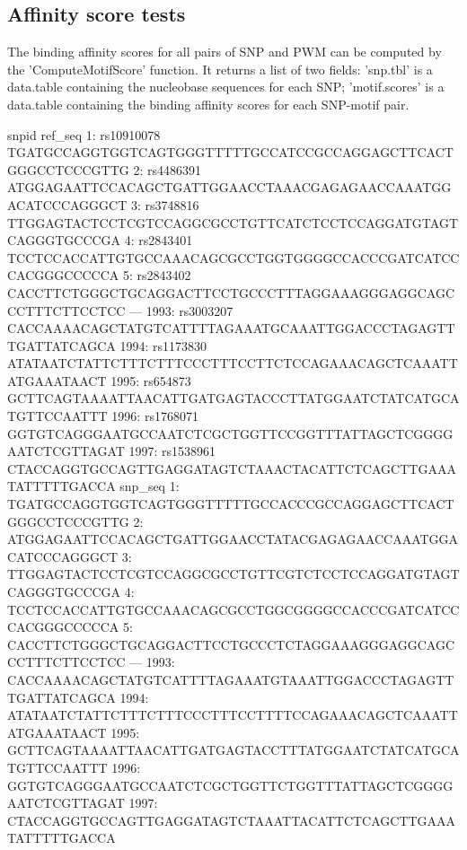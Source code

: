 \documentclass[a4paper,10pt]{article}
\begin{document}
\subsection{Affinity score tests}

The binding affinity scores for all pairs of SNP and PWM can be computed by the 'ComputeMotifScore' function. It returns a list of two fields: 'snp.tbl' is a data.table containing the nucleobase sequences for each SNP; 'motif.scores' is a data.table containing the binding affinity scores for each SNP-motif pair.

\begin{Schunk}
\begin{Soutput}
           snpid                                                       ref_seq
   1: rs10910078 TGATGCCAGGTGGTCAGTGGGTTTTTGCCATCCGCCAGGAGCTTCACTGGGCCTCCCGTTG
   2:  rs4486391 ATGGAGAATTCCACAGCTGATTGGAACCTAAACGAGAGAACCAAATGGACATCCCAGGGCT
   3:  rs3748816 TTGGAGTACTCCTCGTCCAGGCGCCTGTTCATCTCCTCCAGGATGTAGTCAGGGTGCCCGA
   4:  rs2843401 TCCTCCACCATTGTGCCAAACAGCGCCTGGTGGGGCCACCCGATCATCCCACGGGCCCCCA
   5:  rs2843402 CACCTTCTGGGCTGCAGGACTTCCTGCCCTTTAGGAAAGGGAGGCAGCCCTTTCTTCCTCC
  ---                                                                         
1993:  rs3003207 CACCAAAACAGCTATGTCATTTTAGAAATGCAAATTGGACCCTAGAGTTTGATTATCAGCA
1994:  rs1173830 ATATAATCTATTCTTTCTTTCCCTTTCCTTCTCCAGAAACAGCTCAAATTATGAAATAACT
1995:   rs654873 GCTTCAGTAAAATTAACATTGATGAGTACCCTTATGGAATCTATCATGCATGTTCCAATTT
1996:  rs1768071 GGTGTCAGGGAATGCCAATCTCGCTGGTTCCGGTTTATTAGCTCGGGGAATCTCGTTAGAT
1997:  rs1538961 CTACCAGGTGCCAGTTGAGGATAGTCTAAACTACATTCTCAGCTTGAAATATTTTTGACCA
                                                            snp_seq
   1: TGATGCCAGGTGGTCAGTGGGTTTTTGCCACCCGCCAGGAGCTTCACTGGGCCTCCCGTTG
   2: ATGGAGAATTCCACAGCTGATTGGAACCTATACGAGAGAACCAAATGGACATCCCAGGGCT
   3: TTGGAGTACTCCTCGTCCAGGCGCCTGTTCGTCTCCTCCAGGATGTAGTCAGGGTGCCCGA
   4: TCCTCCACCATTGTGCCAAACAGCGCCTGGCGGGGCCACCCGATCATCCCACGGGCCCCCA
   5: CACCTTCTGGGCTGCAGGACTTCCTGCCCTCTAGGAAAGGGAGGCAGCCCTTTCTTCCTCC
  ---                                                              
1993: CACCAAAACAGCTATGTCATTTTAGAAATGTAAATTGGACCCTAGAGTTTGATTATCAGCA
1994: ATATAATCTATTCTTTCTTTCCCTTTCCTTTTCCAGAAACAGCTCAAATTATGAAATAACT
1995: GCTTCAGTAAAATTAACATTGATGAGTACCTTTATGGAATCTATCATGCATGTTCCAATTT
1996: GGTGTCAGGGAATGCCAATCTCGCTGGTTCTGGTTTATTAGCTCGGGGAATCTCGTTAGAT
1997: CTACCAGGTGCCAGTTGAGGATAGTCTAAATTACATTCTCAGCTTGAAATATTTTTGACCA

\end{Soutput}
\end{Schunk}
\end{document}
